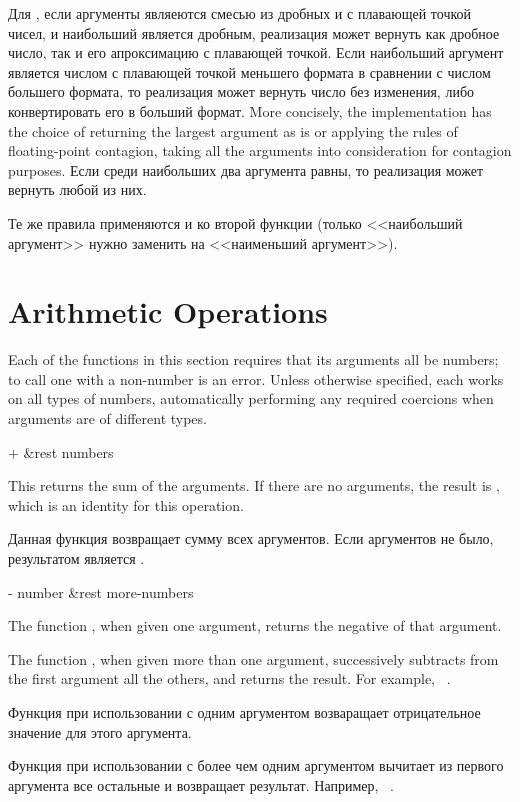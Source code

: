 \begin{defun}[Function]
Для , если аргументы являеются смесью из дробных и с плавающей точкой
чисел, и наибольший является дробным, реализация может вернуть как дробное
число, так и его апроксимацию с плавающей точкой.
Если наибольший аргумент является числом с плавающей точкой меньшего формата в
сравнении с числом большего формата, то реализация может вернуть число без
изменения, либо конвертировать его в больший формат.
More concisely, the implementation has the choice of returning the largest
argument as is or applying the rules of floating-point contagion,
taking all the arguments into consideration for contagion purposes.
Если среди наибольших два аргумента равны, то реализация может вернуть любой из
них.

Те же правила применяются и ко второй функции  (только <<наибольший
аргумент>> нужно заменить на <<наименьший аргумент>>).
\end{defun}

\section{Arithmetic Operations}

Each of the functions in this section requires that its arguments all be
numbers; to call one with a non-number is an error.  Unless otherwise
specified, each works on all types of numbers, automatically performing
any required coercions when arguments are of different types.

\begin{defun}[Function]
+ &rest numbers

This returns the sum of the arguments.  If there are no arguments, the result
is , which is an identity for this operation.

Данная функция возвращает сумму всех аргументов. Если аргументов не было,
результатом является .
\end{defun}

\begin{defun}[Function]
- number &rest more-numbers

The function \cdf{-}, when given one argument, returns the negative
of that argument.

The function \cdf{-}, when given more than one argument, successively subtracts
from the first argument all the others, and returns the result.
For example,  \EV\ .

Функция \cdf{-} при использовании с одним аргументом возваращает отрицательное
значение для этого аргумента.

Функция \cdf{-} при использовании с более чем одним аргументом вычитает из
первого аргумента все остальные и возвращает результат.
Например,  \EV\ .
\end{defun}

